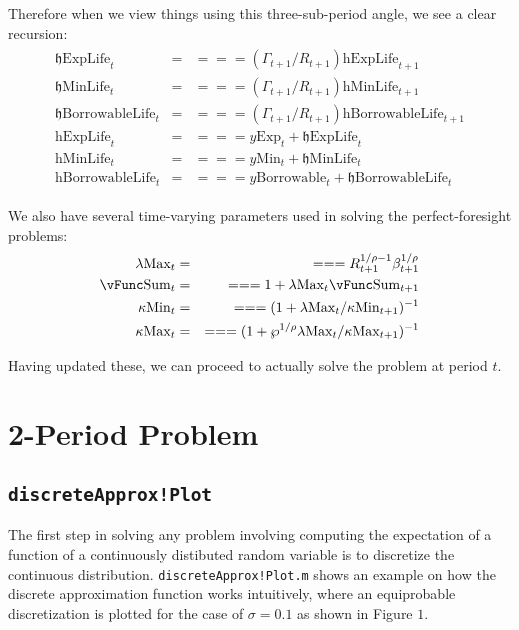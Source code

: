 \documentclass[titlepage,abstract]{\econtex}
\providecommand{\lambdaMax}{\lambda\text{Max}}
\providecommand{\kappaMax}{\kappa\text{Max}}
\providecommand{\kappaMin}{\kappa\text{Min}}
\providecommand{\vSum}{\vFunc\text{Sum}}
\providecommand{\pUnem}{\wp}
\providecommand{\hExpLife}{\mathrm{h}\text{ExpLife}}
\providecommand{\hMinLife}{\mathrm{h}\text{MinLife}}
\providecommand{\hBorrowableLife}{\mathrm{h}\text{BorrowableLife}}
\providecommand{\hEndExpLife}{\mathfrak{h}\text{ExpLife}}
\providecommand{\hEndMinLife}{\mathfrak{h}\text{MinLife}}
\providecommand{\hEndBorrowableLife}{\mathfrak{h}\text{BorrowableLife}}
\providecommand{\yMin}{y\text{Min}}
\providecommand{\yBorrowable}{y\text{Borrowable}}
\providecommand{\yExp}{y\text{Exp}}
\begin{document}
Therefore when we view things using this three-sub-period angle, we see a clear recursion:
\begin{equation}\begin{gathered}\begin{aligned}
          \hEndExpLife_{t}    &=& =  =  =  (\Gamma_{t+1}/R_{t+1}) \hExpLife_{t+1} \\
          \hEndMinLife_{t}    &=& =  =  =  (\Gamma_{t+1}/R_{t+1}) \hMinLife_{t+1} \\
          \hEndBorrowableLife_{t}    &=& =  =  =  (\Gamma_{t+1}/R_{t+1}) \hBorrowableLife_{t+1} \\
          \hExpLife_{t}    &=& =  =  =  \yExp_{t} +\hEndExpLife_{t} \\
          \hMinLife_{t}    &=& =  =  =  \yMin_{t} +\hEndMinLife_{t} \\
          \hBorrowableLife_{t}    &=& =  =  =  \yBorrowable_{t} +\hEndBorrowableLife_{t}
\end{aligned}\end{gathered}\end{equation}

We also have several time-varying parameters used in solving the perfect-foresight problems:
          \begin{equation}\begin{gathered}\begin{aligned}
          \lambdaMax_{t}    &=& =  =  =  R_{t+1}^{1/\rho-1}\beta_{t+1}^{1/\rho} \\
          \vSum_{t}    &=& =  =  =  1+ \lambdaMax_{t} \vSum_{t+1} \\
          \kappaMin_{t}    &=& =  =  =  (1+\lambdaMax_{t}/\kappaMin_{t+1})^{-1} \\
          \kappaMax_{t}    &=& =  =  =  (1+\pUnem^{1/\rho}\lambdaMax_{t}/\kappaMax_{t+1})^{-1}
          \end{aligned}\end{gathered}\end{equation}

Having updated these, we can proceed to actually solve the problem at period $t$.
          
\section{2-Period Problem}
\subsection{\texttt{discreteApprox!Plot}}
The first step in solving any problem involving computing the expectation of a function of a continuously distibuted random variable is to discretize the continuous distribution. \texttt{discreteApprox!Plot.m} shows an example on how the discrete approximation function works intuitively, where an equiprobable discretization is plotted for the case of $\sigma= 0.1$ as shown in Figure $1$.
\end{document}
